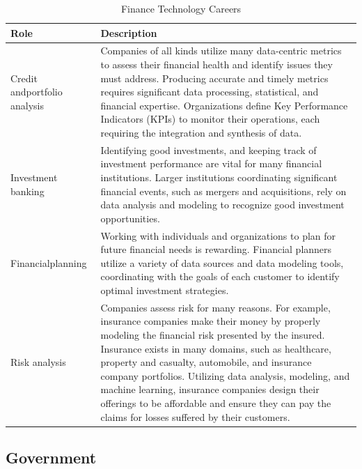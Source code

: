 \begin{table}[H]
	\begin{center}
		\caption{Finance Technology Careers}
		\vskip 4pt
		\begin{tabular}{p{1in}|p{3.4in}} 
			\textbf{Role} & \textbf{Description}\\
			\hline
			Credit and\linebreak portfolio analysis & Companies of all kinds utilize many data-centric metrics to assess their financial health and identify issues they must address. Producing accurate and timely metrics requires significant data processing, statistical, and financial expertise. Organizations define Key Performance Indicators (KPIs) to monitor their operations, each requiring the integration and synthesis of data.\\
			\hline
			Investment banking & Identifying good investments, and keeping track of investment performance are vital for many financial institutions. Larger institutions coordinating significant financial events, such as mergers and acquisitions, rely on data analysis and modeling to recognize good investment opportunities.\\
			\hline
			Financial\linebreak planning & Working with individuals and organizations to plan for future financial needs is rewarding. Financial planners utilize a variety of data sources and data modeling tools, coordinating with the goals of each customer to identify optimal investment strategies.\\
			\hline
			Risk analysis & Companies assess risk for many reasons. For example, insurance companies make their money by properly modeling the financial risk presented by the insured. Insurance exists in many domains, such as healthcare, property and casualty, automobile, and insurance company portfolios. Utilizing data analysis, modeling, and machine learning, insurance companies design their offerings to be affordable and ensure they can pay the claims for losses suffered by their customers.\\
			\hline
		\end{tabular}
	\end{center}
\end{table}

\subsection{Government}


